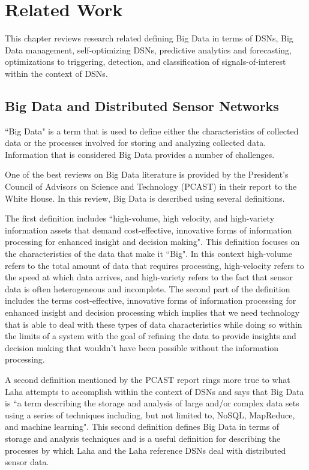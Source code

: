 \chapter{Related Work}\label{ch:related-work}
This chapter reviews research related defining Big Data in terms of DSNs, Big Data management, self-optimizing DSNs, predictive analytics and forecasting, optimizations to triggering, detection, and classification of signals-of-interest within the context of DSNs.

\section{Big Data and Distributed Sensor Networks}\label{sec:big-data-and-distributed-sensor-networks}
``Big Data" is a term that is used to define either the characteristics of collected data or the processes involved for storing and analyzing collected data. Information that is considered Big Data provides a number of challenges.

One of the best reviews on Big Data literature is provided by the President's Council of Advisors on Science and Technology (PCAST) in their report to the White House\cite{house2014big}. In this review, Big Data is described using several definitions.

The first definition includes ``high-volume, high velocity, and high-variety information assets that demand cost-effective, innovative forms of information processing for enhanced insight and decision making"\cite{gartner_it_glossary_2016}. This definition focuses on the characteristics of the data that make it ``Big". In this context high-volume refers to the total amount of data that requires processing, high-velocity refers to the speed at which data arrives, and high-variety refers to the fact that sensor data is often heterogeneous and incomplete. The second part of the definition includes the terms cost-effective, innovative forms of information processing for enhanced insight and decision processing which implies that we need technology that is able to deal with these types of data characteristics while doing so within the limits of a system with the goal of refining the data to provide insights and decision making that wouldn't have been possible without the information processing.

A second definition\cite{ward2013undefined} mentioned by the PCAST report rings more true to what Laha attempts to accomplish within the context of DSNs and says that Big Data is ``a term describing the storage and analysis of large and/or complex data sets using a series of techniques including, but not limited to, NoSQL, MapReduce, and machine learning". This second definition defines Big Data in terms of storage and analysis techniques and is a useful definition for describing the processes by which Laha and the Laha reference DSNs deal with distributed sensor data.

